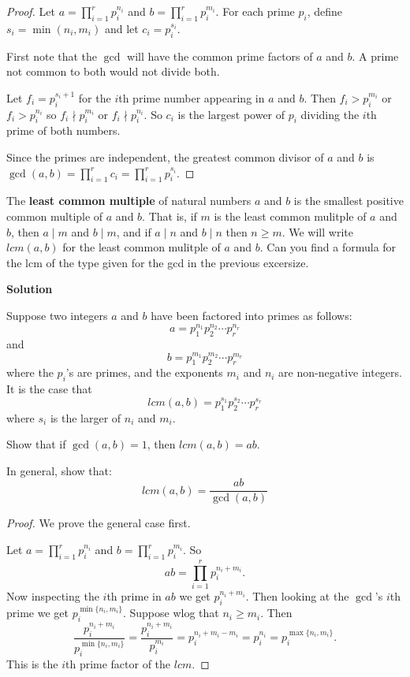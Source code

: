 \begin{proof}
    Let $a = \prod_{i=1}^r p_i^{n_i}$ and $b = \prod_{i=1}^r p_i^{m_i}$.
    For each prime $p_i$, define $s_i = \min(n_i, m_i)$ and let $c_i = p_i^{s_i}$. 

    First note that the $\gcd$ will have the common prime factors of $a$ and $b$.
    A prime not common to both would not divide both.

    Let $f_i = p_i^{s_i + 1}$ for the $i$th prime number appearing in $a$ and $b$. 
    Then $f_i > p_i^{m_i}$ or $f_i > p_i^{n_i}$ so $f_i \nmid p_i^{m_i}$ or $f_i \nmid p_i^{n_i}$.
    So $c_i$ is the largest power of $p_i$ dividing the $i$th prime of both numbers.

    Since the primes are independent, the greatest common divisor of $a$ and $b$ is 
        $\gcd(a,b) = \prod_{i=1}^r c_i = \prod_{i=1}^r p_i^{s_i}$.
\end{proof}

\begin{tcolorbox}[title=Problem 11, breakable]
    The \textbf{least common multiple} of natural numbers $a$ and $b$
    is the smallest positive common multiple of $a$ and $b$. That is,
    if $m$ is the least common mulitple of $a$ and $b$, then $a \mid m$
    and $b \mid m$, and if $a \mid n$ and $b \mid n$ then $n \ge m$.
    We will write $lcm(a, b)$ for the least common mulitple of $a$ and $b$.
    Can you find a formula for the lcm of the type given for the gcd in 
    the previous excersize.
\end{tcolorbox}

\textbf{Solution}

Suppose two integers $a$ and $b$ have been factored into primes as follows:
\[a = p_1^{n_1} p_2^{n_2} \cdots p_r^{n_r}\]
and 
\[b = p_1^{m_1} p_2^{m_2} \cdots p_r^{m_r}\]
where the $p_i$'s are primes, and the exponents $m_i$ and $n_i$ are non-negative 
integers. It is the case that 
\[lcm(a, b) = p_1^{s_1} p_2^{s_2} \cdots p_r^{s_r}\]
where $s_i$ is the larger of $n_i$ and $m_i$.

\begin{tcolorbox}[title=Problem 12, breakable]
    Show that if $\gcd(a, b) = 1$, then $lcm(a, b) = ab$.

    In general, show that:
    \[lcm(a, b) = \frac{ab}{\gcd(a, b)}\]
\end{tcolorbox}

\begin{proof}
    We prove the general case first.

    Let $a = \prod_{i=1}^r p_i^{n_i}$ and $b = \prod_{i=1}^r p_i^{m_i}$.
    So 
    \[
        ab = \prod_{i=1}^r p_i^{n_i+m_i}.
    \]
    Now inspecting the $i$th prime in $ab$ we get $p_i^{n_i + m_i}$.
    Then looking at the $\operatorname{\gcd}$'s $i$th prime we get $p_i^{\min\{n_i, m_i\}}$.
    Suppose wlog that $n_i \geq m_i$.
    Then 
    \[
        \frac{p_i^{n_i + m_i}}{p_i^{\min\{n_i, m_i\}}} 
        = \frac{p_i^{n_i + m_i}}{p_i^{m_i}}
        = p_i^{n_i + m_i - m_i}
        = p_i^{n_i}
        = p_i^{\max\{n_i, m_i\}}.
    \]
    This is the $i$th prime factor of the $lcm$.
\end{proof}

